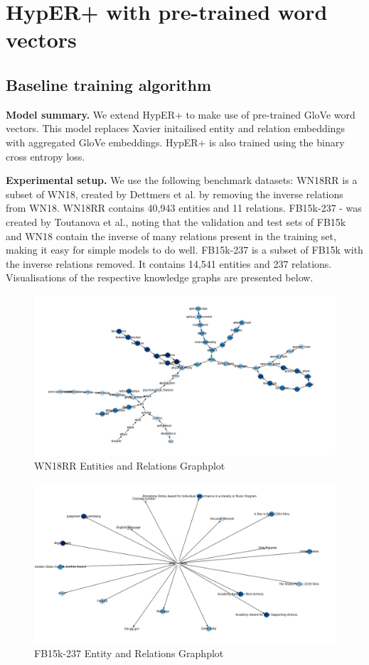 \section{HypER+ with pre-trained word vectors}

\subsection{Baseline training algorithm}
\textbf{Model summary.} We extend HypER+ to make use of pre-trained GloVe word vectors. This model replaces Xavier initailised entity and relation embeddings with aggregated GloVe embeddings. 
HypER+ is also trained using the binary cross entropy loss. \par

\noindent \textbf{Experimental setup.} We use the following benchmark datasets: WN18RR is a subset of WN18, created by Dettmers et al. by removing the inverse relations from WN18. WN18RR contains 40,943 entities and 11 relations. FB15k-237 - was created by Toutanova et al., noting that the validation and test sets of FB15k and WN18 contain the inverse of many relations present in the training set, making it easy for simple models to do well. FB15k-237 is a subset of FB15k with the inverse relations removed. It contains 14,541 entities and 237 relations. Visualisations of the respective knowledge graphs are presented below. 

\begin{figure}[H]
   	\centering
    	\includegraphics[width=\textwidth]{WN18RR_Graph}
	\caption{WN18RR Entities and Relations Graphplot}
\end{figure}

\begin{figure}[H]
   	\centering
    	\includegraphics[width=\textwidth]{FB15k-237_Graph}
	\caption{FB15k-237 Entity and Relations Graphplot}
\end{figure}

